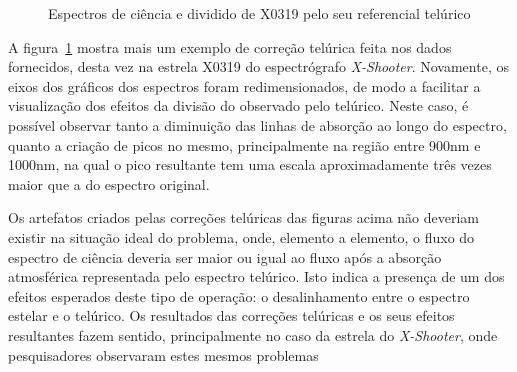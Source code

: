 \begin{figure}[htb]
  \centering
  \hfill
  \caption{Espectros de ciência e dividido de X0319 pelo seu referencial telúrico}
  \label{fig:x0319-division}
\end{figure}

A figura~\ref{fig:x0319-division} mostra mais um exemplo de correção telúrica feita nos dados fornecidos, desta vez na estrela X0319 do espectrógrafo \textit{X-Shooter}. Novamente, os eixos dos gráficos dos espectros foram redimensionados, de modo a facilitar a visualização dos efeitos da divisão do observado pelo telúrico. Neste caso, é possível observar tanto a diminuição das linhas de absorção ao longo do espectro, quanto a criação de picos no mesmo, principalmente na região entre 900nm e 1000nm, na qual o pico resultante tem uma escala aproximadamente três vezes maior que a do espectro original.

Os artefatos criados pelas correções telúricas das figuras acima não deveriam existir na situação ideal do problema, onde, elemento a elemento, o fluxo do espectro de ciência deveria ser maior ou igual ao fluxo após a absorção atmosférica representada pelo espectro telúrico. Isto indica a presença de um dos efeitos esperados deste tipo de operação: o desalinhamento entre o espectro estelar e o telúrico. Os resultados das correções telúricas e os seus efeitos resultantes fazem sentido, principalmente no caso da estrela do \textit{X-Shooter}, onde pesquisadores observaram estes mesmos problemas \citep{unpublished-xshooter-data-release, wavelength-shifts}

